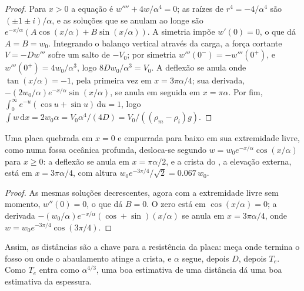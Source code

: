 \begin{proof}
Para $x > 0$ a equação é $w'''' + 4w/\alpha^4 = 0$; as raízes de
$r^4 = -4/\alpha^4$ são $(\pm1 \pm i)/\alpha$, e as soluções que se anulam ao longe
são $e^{-x/\alpha}(A\cos(x/\alpha) + B\sin(x/\alpha))$. A simetria impõe
$w'(0) = 0$, o que dá $A = B = w_0$. Integrando o balanço vertical através
da carga, a força cortante $V = -Dw'''$ sofre um salto de $-V_0$; por simetria
$w'''(0^-) = -w'''(0^+)$, e $w'''(0^+) = 4w_0/\alpha^3$, logo $8Dw_0/\alpha^3 =
V_0$. A deflexão se anula onde $\tan(x/\alpha) =
-1$, pela primeira vez em $x = 3\pi\alpha/4$; sua derivada,
$-(2w_0/\alpha)e^{-x/\alpha}\sin(x/\alpha)$, se anula em seguida em $x = \pi\alpha$.
Por fim, $\int_0^\infty e^{-u}(\cos u + \sin u)\,\mathrm du = 1$, logo
$\int w\,\mathrm dx = 2w_0\alpha = V_0\alpha^4/(4D) = V_0/((\rho_m - \rho_i)g)$.
\end{proof}

\begin{proposition}\label{prop:b3:gravity-geodesy:broken}
Uma placa quebrada em $x = 0$ e empurrada para baixo em sua extremidade livre, como numa fossa
oceânica profunda, desloca-se segundo $w = w_0e^{-x/\alpha}\cos(x/\alpha)$ para $x \ge 0$: a
deflexão se anula em $x = \pi\alpha/2$, e a crista do , a
elevação externa, está em $x = 3\pi\alpha/4$, com altura $w_0e^{-3\pi/4}/\sqrt2 =
\num{0.067}\,w_0$.
\end{proposition}

\begin{proof}
As mesmas soluções decrescentes, agora com a extremidade livre sem momento,
$w''(0) = 0$, o que dá $B = 0$. O zero está em $\cos(x/\alpha) = 0$; a
derivada $-(w_0/\alpha)e^{-x/\alpha}(\cos + \sin)(x/\alpha)$ se anula em
$x = 3\pi\alpha/4$, onde $w = w_0e^{-3\pi/4}\cos(3\pi/4)$.
\end{proof}

Assim, as distâncias são a chave para a resistência da placa: meça onde termina o fosso
ou onde o abaulamento atinge a crista, e $\alpha$ segue, depois $D$, depois $T_e$.
Como $T_e$ entra como $\alpha^{4/3}$, uma boa estimativa de uma distância dá uma boa
estimativa da espessura.

